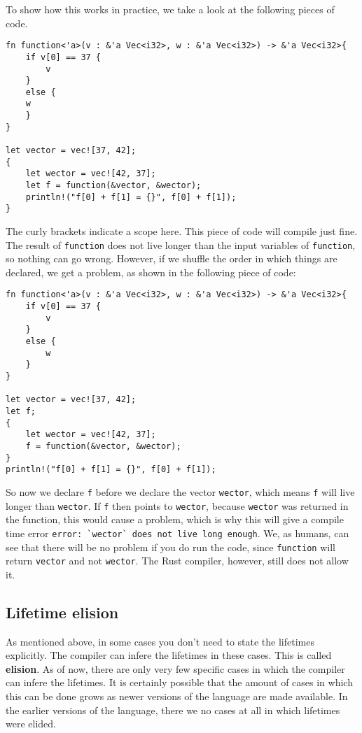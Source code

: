 To show how this works in practice, we take a look at the following pieces of code. 

\begin{verbatim}
fn function<'a>(v : &'a Vec<i32>, w : &'a Vec<i32>) -> &'a Vec<i32>{
    if v[0] == 37 {
        v
    }
    else {
    w
    }
}

let vector = vec![37, 42];
{
    let wector = vec![42, 37];
    let f = function(&vector, &wector);
    println!("f[0] + f[1] = {}", f[0] + f[1]);
}
\end{verbatim}
The curly brackets indicate a scope here. This piece of code will compile just fine. The result of \verb|function| does not live longer than the input variables of \verb|function|, so nothing can go wrong. However, if we shuffle the order in which things are declared, we get a problem, as shown in the following piece of code: 

\begin{verbatim}
fn function<'a>(v : &'a Vec<i32>, w : &'a Vec<i32>) -> &'a Vec<i32>{
    if v[0] == 37 {
        v
    }
    else {
        w
    }
}

let vector = vec![37, 42];
let f;
{
    let wector = vec![42, 37];
    f = function(&vector, &wector);
}
println!("f[0] + f[1] = {}", f[0] + f[1]);
\end{verbatim}

So now we declare \verb|f| before we declare the vector \verb|wector|, which means \verb|f| will live longer than \verb|wector|. If \verb|f| then points to \verb|wector|, because \verb|wector| was returned in the function, this would cause a problem, which is why this will give a compile time error \verb|error: `wector` does not live long enough|. We, as humans, can see that there will be no problem if you do run the code, since \verb|function| will return \verb|vector| and not \verb|wector|. The Rust compiler, however, still does not allow it. 

\subsection{Lifetime elision}
As mentioned above, in some cases you don't need to state the lifetimes explicitly. The compiler can infere the lifetimes in these cases. This is called \textbf{elision}. As of now, there are only very few specific cases in which the compiler can infere the lifetimes. It is certainly possible that the amount of cases in which this can be done grows as newer versions of the language are made available. In the earlier versions of the language, there we no cases at all in which lifetimes were elided. 

